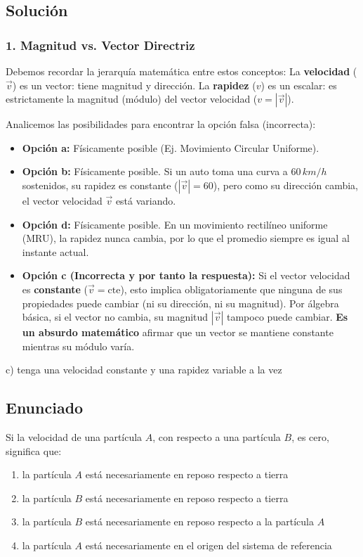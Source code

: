 \documentclass[12pt, a4paper]{article}
\begin{document}
\subsection*{Solución}

\subsubsection*{1. Magnitud vs. Vector Directriz}
Debemos recordar la jerarquía matemática entre estos conceptos:
La \textbf{velocidad} ($\vec{v}$) es un vector: tiene magnitud y dirección.
La \textbf{rapidez} ($v$) es un escalar: es estrictamente la magnitud (módulo) del vector velocidad ($v = |\vec{v}|$).

Analicemos las posibilidades para encontrar la opción falsa (incorrecta):
\begin{itemize}
    \item \textbf{Opción a:} Físicamente posible (Ej. Movimiento Circular Uniforme).
    \item \textbf{Opción b:} Físicamente posible. Si un auto toma una curva a $60\,\si{km/h}$ sostenidos, su rapidez es constante ($|\vec{v}| = 60$), pero como su dirección cambia, el vector velocidad $\vec{v}$ está variando.
    \item \textbf{Opción d:} Físicamente posible. En un movimiento rectilíneo uniforme (MRU), la rapidez nunca cambia, por lo que el promedio siempre es igual al instante actual.
    \item \textbf{Opción c (Incorrecta y por tanto la respuesta):} Si el vector velocidad es \textbf{constante} ($\vec{v} = \text{cte}$), esto implica obligatoriamente que ninguna de sus propiedades puede cambiar (ni su dirección, ni su magnitud). Por álgebra básica, si el vector no cambia, su magnitud $|\vec{v}|$ tampoco puede cambiar. \textbf{Es un absurdo matemático} afirmar que un vector se mantiene constante mientras su módulo varía.
\end{itemize}

\begin{tcolorbox}[colback=green!5!white, colframe=green!50!black, title=Respuesta Final]
\centering \Large c) tenga una velocidad constante y una rapidez variable a la vez
\end{tcolorbox}

\newpage

\subsection*{Enunciado}
Si la velocidad de una partícula $A$, con respecto a una partícula $B$, es cero, significa que:
\begin{enumerate}[label=\alph*)]
    \item la partícula $A$ está necesariamente en reposo respecto a tierra
    \item la partícula $B$ está necesariamente en reposo respecto a tierra
    \item la partícula $B$ está necesariamente en reposo respecto a la partícula $A$
    \item la partícula $A$ está necesariamente en el origen del sistema de referencia
\end{enumerate}
\end{document}
